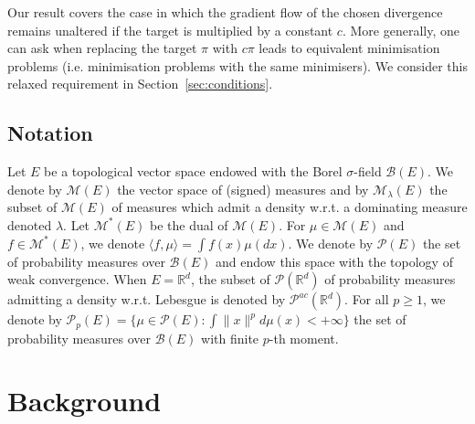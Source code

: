 \documentclass{article}
\newcommand{\cP}{\mathcal P}
\newcommand{\cM}{\mathcal M}
\newcommand{\R}{\mathbb R}
\newcommand{\X}{E}
\newcommand{\ssp}[1]{\langle #1 \rangle}
\newcommand{\norm}[1]{\|#1\|}
\begin{document}
Our result covers the case in which the gradient flow of the chosen divergence remains unaltered if the target is multiplied by a constant $c$. More generally, one can ask when replacing the target $\pi$ with $c\pi$ leads to equivalent minimisation problems (i.e. minimisation problems with the same minimisers). We consider this relaxed requirement in Section~\ref{sec:conditions}.


\subsection*{Notation}
Let $\X$ be a topological vector space endowed with the Borel $\sigma$-field $\mathcal{B}(\X)$. %
We denote by $\cM(\X)$ the vector space of (signed) measures and by $\cM_\lambda(\X)$ the subset of $\cM(\X)$ of measures which admit a density w.r.t. a dominating measure denoted $\lambda$. 
Let $\cM^*(\X)$ be the dual of $\cM(\X)$.
    For $\mu\in \cM(\X)$ and $f\in \cM^*(\X)$, we denote $\ssp{f, \mu}=\int f(x)\mu(dx)$. 
We denote by $\mathcal{P}(\X)$ the set of probability measures over
$\mathcal{B}(\X)$ and endow this space with the topology of weak convergence.  When $\X = \R^d$, the subset of $\mathcal{P}(\R^d)$ of probability measures admitting a density w.r.t. Lebesgue is denoted by $\mathcal{P}^{ac}(\R^d)$. 
For all $p\geq 1$, we denote by
$\mathcal{P}_p(\X) = \{\mu \in \mathcal{P}(\X):\int
  \norm{x}^p d \mu(x) < +\infty\}$ the set of probability measures over
$\mathcal{B}(\X)$ with finite $p$-th moment.   %

\section{Background}
\end{document}
